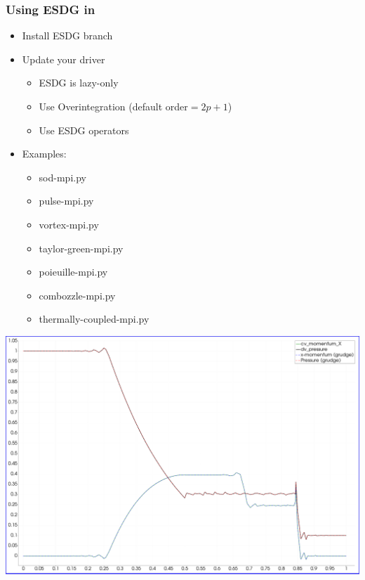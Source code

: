\begin{frame}\frametitle{Using ESDG in \mirgecom{}}
\begin{multicols}{2}
\begin{itemize}
\item Install \mirgecom{} ESDG branch
\item Update your driver
\begin{itemize}
\item ESDG is lazy-only
\item Use Overintegration (default order$=2p+1$)
\item Use ESDG operators
\end{itemize}
\item Examples:
\begin{itemize}
\item sod-mpi.py
\item pulse-mpi.py
\item vortex-mpi.py
\item taylor-green-mpi.py
\item poieuille-mpi.py
\item combozzle-mpi.py
\item thermally-coupled-mpi.py
\end{itemize}
\end{itemize}
\columnbreak
\includegraphics[width=.48\textwidth]{figures/compare-sod-shock-esdg-grudge.png}
\end{multicols}
\end{frame}

